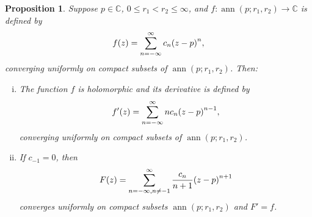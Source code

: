 \documentclass[12pt,openany]{book}
\newcommand{\avoidbreak}{\postdisplaypenalty=100}
\newcommand{\ann}{\operatorname{ann}}
\newcommand{\C}{{\mathbb{C}}}
\theoremstyle{plain}
\newtheorem{prop}[thm]{Proposition}
\theoremstyle{remark}
\theoremstyle{definition}
\theoremstyle{exercise}
\theoremstyle{example}
\begin{document}
\begin{prop} \label{prop:diffantidifflaurent}
Suppose $p \in \C$, $0 \leq r_1 < r_2 \leq \infty$, and
$f \colon \ann(p;r_1,r_2) \to \C$ is defined by
\begin{equation*}
f(z) = \sum_{n=-\infty}^\infty c_n {(z-p)}^n ,
\avoidbreak
\end{equation*}
converging uniformly on compact subsets of $\ann(p;r_1,r_2)$.  Then:
\begin{enumerate}[(i)]
\item
The function
$f$ is holomorphic and its 
derivative is defined by
\begin{equation*}
f'(z) = \sum_{n=-\infty}^\infty n c_n {(z-p)}^{n-1} ,
\avoidbreak
\end{equation*}
converging uniformly on compact subsets of $\ann(p;r_1,r_2)$.
\item
If $c_{-1} = 0$, then
\begin{equation*}
F(z) = \sum_{n=-\infty,n\not=-1}^\infty \frac{c_n}{n+1} {(z-p)}^{n+1}
\avoidbreak
\end{equation*}
converges uniformly on compact subsets 
$\ann(p;r_1,r_2)$ and $F' = f$.
\end{enumerate}
\end{prop}
\end{document}
